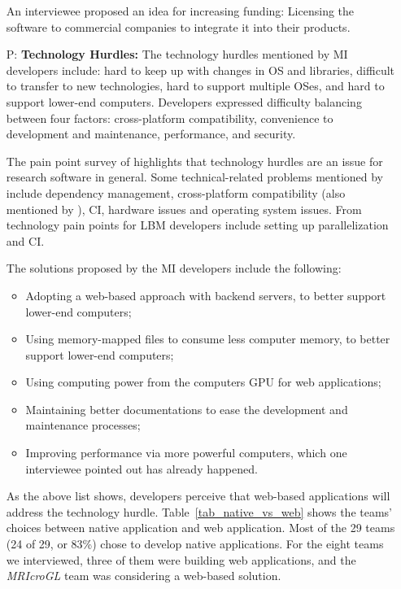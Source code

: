 \documentclass[final, 12pt, 3p, times]{elsarticle}
\newcounter{pnum} %
\begin{document}
\begin{enumerate}
An interviewee proposed an idea for increasing funding: Licensing the software
to commercial companies to integrate it into their products.
    
\item[P\refstepcounter{pnum}\thepnum \label{P_TechnologyHurdles}:]
\textbf{Technology Hurdles:} The technology hurdles mentioned by MI developers
include: hard to keep up with changes in OS and libraries, difficult to transfer
to new technologies, hard to support multiple OSes, and hard to support lower-end
computers. Developers expressed difficulty balancing between four factors:
cross-platform compatibility, convenience to development and maintenance,
performance, and security.

The pain point survey of \cite{WieseEtAl2019} highlights that technology
hurdles are an issue for research software in general.  Some technical-related
problems mentioned by \cite{WieseEtAl2019} include dependency management,
cross-platform compatibility (also mentioned by \cite{PintoEtAl2018}), CI,
hardware issues and operating system issues. From \cite{SmithEtAl2024}
technology pain points for LBM developers include setting up parallelization and
CI. 

The solutions proposed by the MI developers include the following:

\begin{itemize}
\item Adopting a web-based approach with backend servers, to better support
lower-end computers;
\item Using memory-mapped files to consume less computer memory, to better
support lower-end computers; 
\item Using computing power from the computers GPU for web applications;
\item Maintaining better documentations to ease the development and maintenance
processes;
\item Improving performance via more powerful computers, which one interviewee
pointed out has already happened.
\end{itemize}

As the above list shows, developers perceive that web-based applications will
address the technology hurdle.  Table~\ref{tab_native_vs_web} shows the teams'
choices between native application and web application. Most of the 29 teams (24
of 29, or 83\%) chose to develop native applications. For the eight teams we
interviewed, three of them were building web applications, and the
\textit{MRIcroGL} team was considering a web-based solution.


\end{enumerate}
\end{document}
